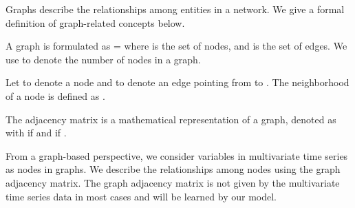\documentclass[sigconf]{acmart}
\begin{document}
\begin{comment}
In a single step forecasting setting, the optimization objective is 


In a multi-step forecasting setting, the optimization objective is 


\end{comment}




Graphs describe the relationships among entities in a network. We give a formal definition of graph-related concepts below.
	\begin{definition}[Graph]
		A graph is formulated as  =  where  is the set of nodes, and  is the set of edges. We use  to denote the number of nodes in a graph.
	\end{definition}

	\begin{definition}
    Let  to denote a node and  to denote an edge pointing from  to . The neighborhood of a node  is defined as .
	\end{definition}


    \begin{definition}
		The adjacency matrix is a mathematical representation of a graph, denoted as  with  if  and  if . 
	\end{definition}


From a graph-based perspective, we consider variables in multivariate time series as nodes in graphs. We describe the relationships among nodes using the graph adjacency matrix. The graph adjacency matrix is not given by the multivariate time series data in most cases and will be learned by our model. 

\begin{comment}
\subtscommenection{Graph Convolution}
Rooted from graph signal processing, graph convolution have been widely used to extract relational information within graphs. Analogous to image convolution, graph convolution takes the weighted average of a node's neighborhood information. Assuming an undirected graph, the most common graph convolution is defined as \cite{kipf2017semi},

where  is a node feature matrix,  is a parameter matrix, ,  is an identity matrix, and  is a diagonal matrix with . Equation \ref{eq:gcn} can be better understood from an individual node level, 

In simple words, graph convolution computes the hidden state of a node by passing its neighborhood feature information to the central node with a linear transformation. 
\end{comment}
\end{document}
